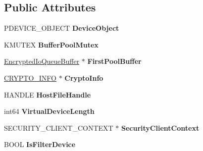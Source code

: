 \subsection*{Public Attributes}
\begin{DoxyCompactItemize}
\item 
\mbox{\label{struct_encrypted_io_queue_ad3d978e461f7fd15272c45b3ffce5264}} 
P\+D\+E\+V\+I\+C\+E\+\_\+\+O\+B\+J\+E\+CT {\bfseries Device\+Object}
\item 
\mbox{\label{struct_encrypted_io_queue_acaa423f2ecd2c6614d7b66d6a5261ba5}} 
K\+M\+U\+T\+EX {\bfseries Buffer\+Pool\+Mutex}
\item 
\mbox{\label{struct_encrypted_io_queue_a6fe8e61e93e3c417f5d02fcc67176f7b}} 
\hyperlink{struct_encrypted_io_queue_buffer_struct}{Encrypted\+Io\+Queue\+Buffer} $\ast$ {\bfseries First\+Pool\+Buffer}
\item 
\mbox{\label{struct_encrypted_io_queue_a002068b6ff6acf126b519a8fc80f970c}} 
\hyperlink{struct_c_r_y_p_t_o___i_n_f_o__t}{C\+R\+Y\+P\+T\+O\+\_\+\+I\+N\+FO} $\ast$ {\bfseries Crypto\+Info}
\item 
\mbox{\label{struct_encrypted_io_queue_a8866eb4dd4f987ffc9f637f7bfe71003}} 
H\+A\+N\+D\+LE {\bfseries Host\+File\+Handle}
\item 
\mbox{\label{struct_encrypted_io_queue_a646476115475c9cde7d4b8712cedc8ff}} 
int64 {\bfseries Virtual\+Device\+Length}
\item 
\mbox{\label{struct_encrypted_io_queue_a79876d69cad37854b290e0b46bf9ef25}} 
S\+E\+C\+U\+R\+I\+T\+Y\+\_\+\+C\+L\+I\+E\+N\+T\+\_\+\+C\+O\+N\+T\+E\+XT $\ast$ {\bfseries Security\+Client\+Context}
\item 
\mbox{\label{struct_encrypted_io_queue_a5cef5dab979749a39cb63dfbf4da2c6f}} 
B\+O\+OL {\bfseries Is\+Filter\+Device}
\item 
\mbox{\label{struct_encrypted_io_queue_ac4cfdd5c7ab8677d34988661150cc59c}} 

\end{DoxyCompactItemize}
